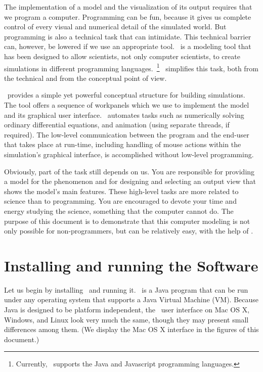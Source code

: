 The implementation of a model and the visualization of its output requires that we program a computer. Programming can
be fun, because it gives us complete control of every visual and numerical detail of the simulated world. But
programming is also a technical task that can intimidate. This technical barrier can, however, be
lowered if we use an appropriate tool. \Ejs\ is a modeling tool that has been designed to allow
scientists, not only computer scientists, to create simulations in different programming languages.~\footnote{Currently, \ejs\ supports the Java and Javascript programming languages.} \ejs\ simplifies this task, both from the
technical and from the conceptual point of view.

\ejs\ provides a simple yet powerful conceptual structure for building simulations. The tool offers a sequence of
workpanels which we use to implement the model and its graphical user interface. \ejs\ automates tasks such as
numerically solving ordinary differential equations,  and animation (using separate threads, if required). The low-level communication between the program and the end-user that takes place at run-time, including handling of mouse actions within the simulation's graphical interface, is
accomplished without low-level programming.

Obviously, part of the task still depends on us. You are responsible for providing a model for the phenomenon and for
designing and selecting an output view that shows the model's main features. These high-level tasks are more related to
science than to programming. You are encouraged to devote your time and energy studying the science, something that the
computer cannot do. The purpose of this document is to demonstrate that this computer modeling is not only possible for non-programmers, but
can be relatively easy, with the help of \Ejs.

    \section{Installing and running the Software}\label{section:02Installation}

Let us begin by installing \Ejs\  and running it. \ejs\ is a Java program that can be run under any operating system
that supports a Java Virtual Machine (VM). Because Java is designed to be platform independent, the \ejs\ user
interface on Mac OS X, Windows, and Linux look very much the same, though they may present small differences among them. (We display the Mac OS X interface in the figures of this document.)

